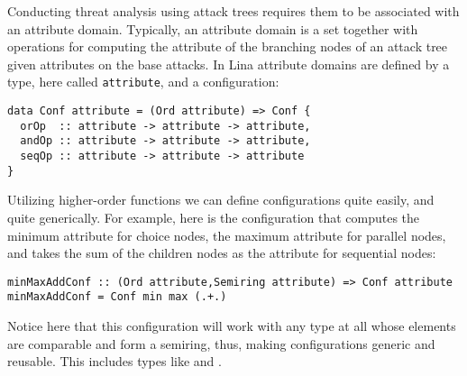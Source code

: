 Conducting threat analysis using attack trees requires them to be
associated with an attribute domain.  Typically, an attribute domain
is a set together with operations for computing the attribute of the
branching nodes of an attack tree given attributes on the base
attacks.  In Lina attribute domains are defined by a type, here called
\verb!attribute!, and a configuration:
\begin{center}
  \begin{verbatim}
data Conf attribute = (Ord attribute) => Conf {
  orOp  :: attribute -> attribute -> attribute,    
  andOp :: attribute -> attribute -> attribute,
  seqOp :: attribute -> attribute -> attribute
}
\end{verbatim}
\end{center}
Utilizing higher-order functions we can define configurations quite
easily, and quite generically.  For example, here is the configuration
that computes the minimum attribute for choice nodes, the maximum
attribute for parallel nodes, and takes the sum of the children nodes
as the attribute for sequential nodes:
\begin{center}
  \begin{verbatim}
minMaxAddConf :: (Ord attribute,Semiring attribute) => Conf attribute
minMaxAddConf = Conf min max (.+.)
\end{verbatim}
\end{center}
Notice here that this configuration will work with any type at all
whose elements are comparable and form a semiring, thus, making
configurations generic and reusable.  This includes types like
 and .

